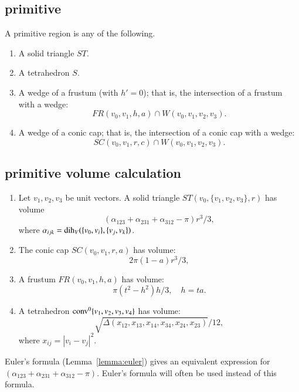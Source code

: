 \subsection{primitive}

\begin{definition} A primitive region is any of the following.

\begin{enumerate}%
 \item A solid triangle $ST$.
 \item A tetrahedron $S$.
 \item A wedge of a frustum (with $h'=0$); 
that is, the intersection of a frustum with
 a wedge:
    $$
     FR(v_0,v_1,h,a) \cap W(v_0,v_1,v_2,v_3).
    $$
\item A wedge of a conic cap; that is, the intersection of a conic cap
with
    a wedge:
    $$
    SC(v_0,v_1,r,c) \cap W(v_0,v_1,v_2,v_3).
    $$
\end{enumerate}

\end{definition}

\subsection{primitive volume calculation}\label{sec:primitive}

\begin{lemma} 
\begin{enumerate} 
 \item {} Let $v_1,v_2,v_3$ be unit vectors.
   A solid triangle $ST(v_0,\{v_1,v_2,v_3\},r)$ has volume
   $$
   (\alpha_{123}+\alpha_{231}+\alpha_{312}-\pi)r^3/3,
   $$
   where $\alpha_{ijk} = \operatorname{dih}_V(\{v_0,v_i\},\{v_j,v_k\})$.
  \item {} The conic cap $SC(v_0,v_1,r,a)$ has volume:
   $$
    2\pi(1-a) r^3/3,
   $$
 \item {} A frustum $FR(v_0,v_1,h,a)$ has volume:
   $$
   \pi (t^2-h^2) h/3,\quad h = t a.
   $$
 \item{} A tetrahedron ${\operatorname{conv}}^0\{v_1,v_2,v_3,v_4\}$ has volume:
   $$
   \sqrt{\Delta(x_{12},x_{13},x_{14},x_{34},x_{24},x_{23})}/12,
   $$
   where $x_{ij} = |v_i-v_j|^2$.
\end{enumerate}
\end{lemma}

Euler's formula (Lemma~\ref{lemma:euler}) gives an
equivalent expression for $(\alpha_{123}+\alpha_{231}+\alpha_{312}-\pi)$.
Euler's formula will often be used instead of this formula.

